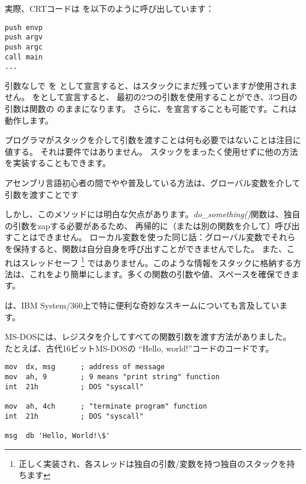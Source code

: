 実際、\ac{CRT}コードは \main を以下のように呼び出しています：
	
\begin{lstlisting}[style=customasmx86]
push envp
push argv
push argc
call main
...
\end{lstlisting}

引数なしで \main を \main として宣言すると、\main はスタックにまだ残っていますが使用されません。 
\main をとして宣言すると、
最初の2つの引数を使用することができ、3つ目の引数は関数の のままになります。 
さらに、を宣言することも可能です。これは動作します。



プログラマがスタックを介して引数を渡すことは何も必要ではないことは注目に値する。
それは要件ではありません。 スタックをまったく使用せずに他の方法を実装することもできます。

アセンブリ言語初心者の間でやや普及している方法は、グローバル変数を介して引数を渡すことです



しかし、このメソッドには明白な欠点があります。\emph{do\_something()}関数は、独自の引数をzapする必要があるため、
再帰的に（または別の関数を介して）呼び出すことはできません。 
ローカル変数を使った同じ話：グローバル変数でそれらを保持すると、関数は自分自身を呼び出すことができませんでした。 
また、これはスレッドセーフ
\footnote{正しく実装され、各スレッドは独自の引数/変数を持つ独自のスタックを持ちます}
ではありません。このような情報をスタックに格納する方法は、これをより簡単にします。多くの関数の引数や値、スペースを確保できます。

は、IBM System/360上で特に便利な奇妙なスキームについても言及しています。


MS-DOSには、レジスタを介してすべての関数引数を渡す方法がありました。
たとえば、古代16ビットMS-DOSの ``Hello, world!''コードのコードです。

\begin{lstlisting}[style=customasmx86]
mov  dx, msg      ; address of message
mov  ah, 9        ; 9 means "print string" function
int  21h          ; DOS "syscall"

mov  ah, 4ch      ; "terminate program" function
int  21h          ; DOS "syscall"

msg  db 'Hello, World!\$'
\end{lstlisting}

